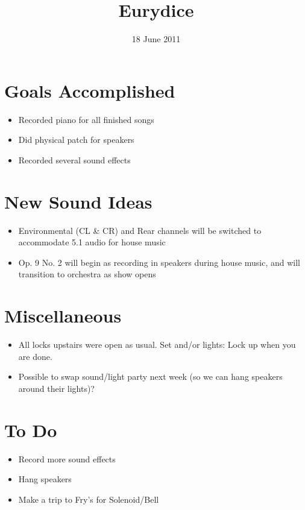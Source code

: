 \documentclass[11pt]{article}
\title{Eurydice}
\date{18 June 2011}
\begin{document}
\maketitle

\section*{Goals Accomplished}

\begin{itemize}
	\item Recorded piano for all finished songs
	\item Did physical patch for speakers
	\item Recorded several sound effects
\end{itemize}

\section*{New Sound Ideas}

\begin{itemize}
	\item Environmental (CL \& CR) and Rear channels will be switched to accommodate 5.1 audio for house music
	\item Op. 9 No. 2 will begin as recording in speakers during house music, and will transition to orchestra as show opens
\end{itemize}

\section*{Miscellaneous}

\begin{itemize}
	\item All locks upstairs were open as usual. Set and/or lights: Lock up when you are done.
	\item Possible to swap sound/light party next week (so we can hang speakers around their lights)?
\end{itemize}

\section*{To Do}

\begin{itemize}
	\item Record more sound effects
	\item Hang speakers
	\item Make a trip to Fry's for Solenoid/Bell
\end{itemize}

\attendance
\end{document}
